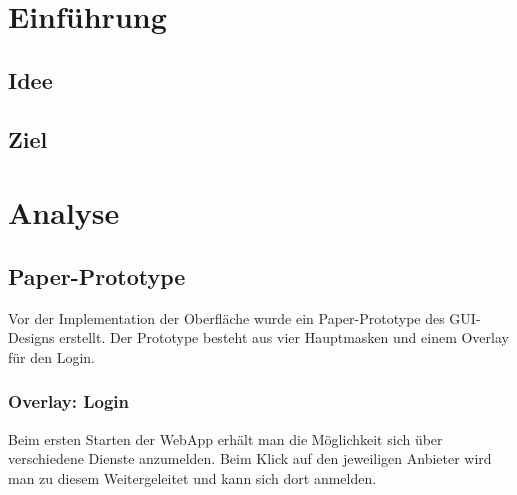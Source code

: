 \section{Einführung}
\subsection{Idee}


\subsection{Ziel}


\section{Analyse}

\setcounter{subfigure}{0}

\subsection{Paper-Prototype}
Vor der Implementation der Oberfläche wurde ein Paper-Prototype des GUI-Designs erstellt.
Der Prototype besteht aus vier Hauptmasken und einem Overlay für den Login.

\subsubsection{Overlay: Login}
Beim ersten Starten der \gls{WebApp} erhält man die Möglichkeit sich über verschiedene Dienste anzumelden.
Beim Klick auf den jeweiligen Anbieter wird man zu diesem Weitergeleitet und kann sich dort anmelden.

